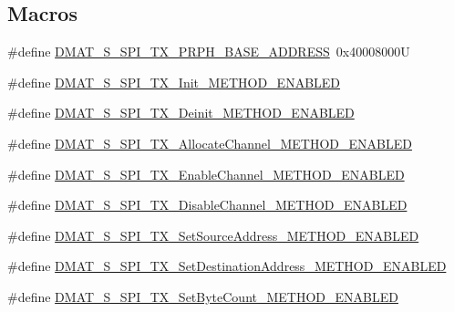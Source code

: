 \subsection*{Macros}
\begin{DoxyCompactItemize}
\item 
\#define \hyperlink{group___d_m_a_t___s___s_p_i___t_x__module_gac7fce53876f35bc9f95229ae843aa859}{D\-M\-A\-T\-\_\-\-S\-\_\-\-S\-P\-I\-\_\-\-T\-X\-\_\-\-P\-R\-P\-H\-\_\-\-B\-A\-S\-E\-\_\-\-A\-D\-D\-R\-E\-S\-S}~0x40008000\-U
\item 
\#define \hyperlink{group___d_m_a_t___s___s_p_i___t_x__module_gac4a61a228e24385816a0d5ecd3265b38}{D\-M\-A\-T\-\_\-\-S\-\_\-\-S\-P\-I\-\_\-\-T\-X\-\_\-\-Init\-\_\-\-M\-E\-T\-H\-O\-D\-\_\-\-E\-N\-A\-B\-L\-E\-D}
\item 
\#define \hyperlink{group___d_m_a_t___s___s_p_i___t_x__module_gaa89d37776f8ae3b0a6cf010285f2655e}{D\-M\-A\-T\-\_\-\-S\-\_\-\-S\-P\-I\-\_\-\-T\-X\-\_\-\-Deinit\-\_\-\-M\-E\-T\-H\-O\-D\-\_\-\-E\-N\-A\-B\-L\-E\-D}
\item 
\#define \hyperlink{group___d_m_a_t___s___s_p_i___t_x__module_ga9fa2fd3e75763e7fcc4e78b0ae67d755}{D\-M\-A\-T\-\_\-\-S\-\_\-\-S\-P\-I\-\_\-\-T\-X\-\_\-\-Allocate\-Channel\-\_\-\-M\-E\-T\-H\-O\-D\-\_\-\-E\-N\-A\-B\-L\-E\-D}
\item 
\#define \hyperlink{group___d_m_a_t___s___s_p_i___t_x__module_ga7d92b279d0ad9677e996cc3eb15b2675}{D\-M\-A\-T\-\_\-\-S\-\_\-\-S\-P\-I\-\_\-\-T\-X\-\_\-\-Enable\-Channel\-\_\-\-M\-E\-T\-H\-O\-D\-\_\-\-E\-N\-A\-B\-L\-E\-D}
\item 
\#define \hyperlink{group___d_m_a_t___s___s_p_i___t_x__module_ga29bdecf104328eec40879079501480c0}{D\-M\-A\-T\-\_\-\-S\-\_\-\-S\-P\-I\-\_\-\-T\-X\-\_\-\-Disable\-Channel\-\_\-\-M\-E\-T\-H\-O\-D\-\_\-\-E\-N\-A\-B\-L\-E\-D}
\item 
\#define \hyperlink{group___d_m_a_t___s___s_p_i___t_x__module_ga7cc4b3489911a6aea61920c4982c6dc0}{D\-M\-A\-T\-\_\-\-S\-\_\-\-S\-P\-I\-\_\-\-T\-X\-\_\-\-Set\-Source\-Address\-\_\-\-M\-E\-T\-H\-O\-D\-\_\-\-E\-N\-A\-B\-L\-E\-D}
\item 
\#define \hyperlink{group___d_m_a_t___s___s_p_i___t_x__module_ga355ddce7c6ceb858167bae530fb1068b}{D\-M\-A\-T\-\_\-\-S\-\_\-\-S\-P\-I\-\_\-\-T\-X\-\_\-\-Set\-Destination\-Address\-\_\-\-M\-E\-T\-H\-O\-D\-\_\-\-E\-N\-A\-B\-L\-E\-D}
\item 
\#define \hyperlink{group___d_m_a_t___s___s_p_i___t_x__module_ga47163e28c82d12c8a0fb19d5a0445b09}{D\-M\-A\-T\-\_\-\-S\-\_\-\-S\-P\-I\-\_\-\-T\-X\-\_\-\-Set\-Byte\-Count\-\_\-\-M\-E\-T\-H\-O\-D\-\_\-\-E\-N\-A\-B\-L\-E\-D}

\end{DoxyCompactItemize}
